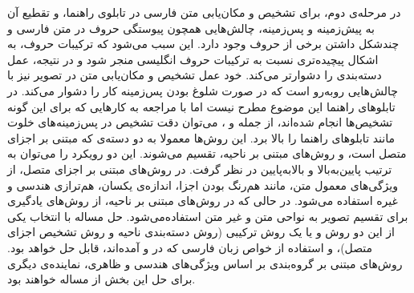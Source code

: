 \documentclass[12pt,a4paper]{article}
\theoremstyle{definition}
\theoremstyle{theorem}
\theoremstyle{definition}
\begin{document}
در مرحله‌ی دوم، برای تشخیص و مکان‌یابی متن فارسی در تابلوی راهنما، و تقطیع آن به پیش‌زمینه و پس‌زمینه، چالش‌هایی همچون پیوستگی حروف در متن فارسی و چندشکل داشتن برخی از حروف وجود دارد. این سبب می‌شود که ترکیبات حروف، به اشکال پیچیده‌تری نسبت به ترکیبات حروف انگلیسی منجر ‌شود و در نتیجه، عمل دسته‌بندی را دشوارتر می‌کند. خود عمل تشخیص و مکان‌یابی متن در تصویر نیز با چالش‌هایی روبه‌رو است که در صورت شلوغ بودن پس‌زمینه کار را دشوار می‌کند. در تابلوهای راهنما این موضوع مطرح نیست اما با مراجعه به کارهایی که برای این گونه تشخیص‌ها انجام شده‌اند، از جمله \cite{hybrid} و \cite{group}، می‌توان دقت تشخیص در پس‌زمینه‌های خلوت مانند تابلوهای راهنما‌ را بالا برد. این روش‌ها معمولا به دو دسته‌ی   که مبتنی بر اجزای متصل است، و روش‌های مبتنی بر ناحیه، تقسیم می‌شوند. این دو رویکرد را می‌توان به ترتیب پایین‌به‌بالا و بالابه‌پایین در نظر گرفت. در روش‌های مبتنی بر اجزای متصل، از ویژگی‌های معمول متن، مانند هم‌رنگ بودن اجزا، اندازه‌ی یکسان، هم‌ترازی هندسی و غیره استفاده می‌شود. در حالی که در روش‌های مبتنی بر ناحیه، از روش‌های یادگیری برای تقسیم تصویر به نواحی متن و غیر متن استفاده‌می‌شود. حل مساله با انتخاب یکی از این دو روش و یا یک روش ترکیبی (روش دسته‌بندی ناحیه و روش تشخیص اجزای متصل)، و استفاده از خواص زبان فارسی که در \cite{faVid} و \cite{faAut} آمده‌اند، قابل حل خواهد بود. روش‌های مبتنی بر گروه‌بندی بر اساس ویژگی‌های هندسی و ظاهری، نماینده‌ی دیگری برای حل این بخش از مساله خواهند بود.
\end{document}
